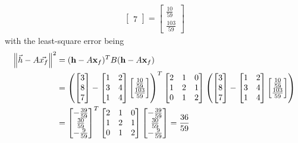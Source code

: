 \begin{solution}
\begin{align*}
\begin{bmatrix}
7
\end{bmatrix}
=
\begin{bmatrix}
\frac{10}{59} \\
\frac{103}{59}
\end{bmatrix}
\end{align*}
with the least-square error being
\begin{align*}
\norm{\vec{h}-A\vec{x_f}}^2 &=
(\textbf{h}-A\textbf{x}_f)^T B (\textbf{h}-A\textbf{x}_f)\\
&=
\left(\begin{bmatrix}
3 \\
8 \\
7
\end{bmatrix}-
\begin{bmatrix}
1 & 2 \\
3 & 4 \\
1 & 4
\end{bmatrix}
\begin{bmatrix}
\frac{10}{59} \\
\frac{103}{59}
\end{bmatrix}\right)^T
\begin{bmatrix}
2&1&0\\ 
1&2&1\\
0&1&2
\end{bmatrix}
\left(\begin{bmatrix}
3 \\
8 \\
7
\end{bmatrix}-
\begin{bmatrix}
1 & 2 \\
3 & 4 \\
1 & 4
\end{bmatrix}
\begin{bmatrix}
\frac{10}{59} \\
\frac{103}{59}
\end{bmatrix}\right) \\
&=
\begin{bmatrix}
-\frac{39}{59}\\ 
\frac{30}{59}\\ 
-\frac{9}{59}
\end{bmatrix}^T
\begin{bmatrix}
2&1&0\\ 
1&2&1\\
0&1&2
\end{bmatrix}
\begin{bmatrix}
-\frac{39}{59}\\ 
\frac{30}{59}\\ 
-\frac{9}{59}
\end{bmatrix}
= \frac{36}{59}
\end{align*}
\end{solution}
